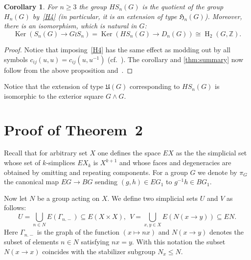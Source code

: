 \documentclass[oneside, 10pt]{amsart}
\theoremstyle{plain}
\numberwithin{equation}{section}
\numberwithin{lemma}{section}
\newtheorem{cor}[lemma]{Corollary}
\theoremstyle{remark}
\theoremstyle{definition}
\DeclareMathOperator{\HH}{H}
\DeclareMathOperator{\Ker}{Ker}
\newcommand{\ZZ}{\mathbb{Z}}
\begin{document}
\begin{cor} \label{cor:main} For $n \geq 3$ the group $HS_n(G)$ is the quotient of the group $H_n(G)$ by~\eqref{H4} (in particular, 
 it is an extension of type $\mathfrak{H}_n(G)$).
Moreover, there is an isomorphism, which is natural in $G$:
\begin{equation} \Ker(S_n(G) \to G \wr S_n) = \Ker(HS_n(G) \to D_n(G)) \cong \HH_2(G, \ZZ). \end{equation} \end{cor}
\begin{proof}
Notice that imposing~\eqref{H4} has the same effect as modding out by all symbols $c_{ij}(u, u) = c_{ij}(u, u^{-1})$ (cf.~\cite[p.~87]{Reh78}).
The corollary and \cref{thm:summary} now follow from the above proposition and~\cite[Proposition~5]{De76}.
\end{proof}
Notice that the extension of type $\mathfrak{U}(G)$ corresponding to $HS_n(G)$ is isomorphic to the exterior square $G\wedge G$. 

\section{Proof of Theorem~2} \label{sec:main}
Recall that for arbitrary set $X$ one defines the space $EX$ as the the simplicial set whose set of $k$-simplices $EX_k$
 is $X^{k+1}$ and whose faces and degeneracies are obtained by omitting and repeating components. 
For a group $G$ we denote by $\pi_G$ the canonical map $EG \to BG$ sending $(g, h) \in EG_1$ to $g^{-1}h \in BG_1$.
 
Now let $N$ be a group acting on $X$. We define two simplicial sets $U$ and $V$ as follows:
\[ U = \bigcup\limits_{n\in N} E(\Gamma_{n.-}) \subseteq E(X\times X),\ \ V = \bigcup\limits_{x,y\in X}E(N(x\to y)) \subseteq EN. \]
Here $\Gamma_{n.-}$ is the graph of the function $(x \mapsto nx)$ and $N(x\to y)$ denotes the subset of elements $n\in N$ satisfying $nx=y$.
With this notation the subset $N(x\to x)$ coincides with the stabilizer subgroup $N_x \leq N$.
\end{document}
